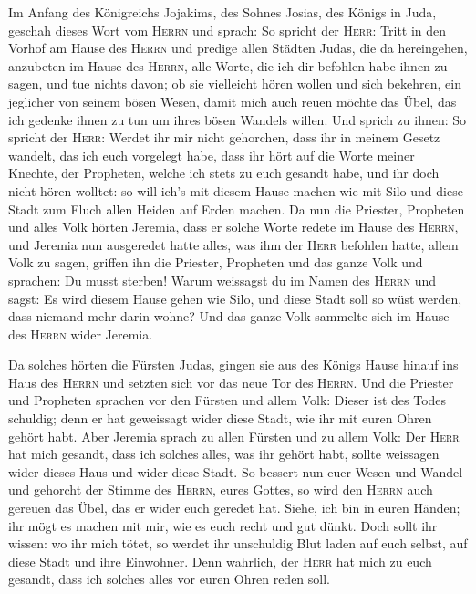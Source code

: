  Im Anfang des Königreichs Jojakims, des Sohnes Josias,
des Königs in Juda, geschah dieses Wort vom \textsc{Herrn} und sprach:
 So spricht der \textsc{Herr}: Tritt in den Vorhof am
Hause des \textsc{Herrn} und predige allen Städten Judas, die da
hereingehen, anzubeten im Hause des \textsc{Herrn}, alle Worte, die ich
dir befohlen habe ihnen zu sagen, und tue nichts davon; 
ob sie vielleicht hören wollen und sich bekehren, ein jeglicher von
seinem bösen Wesen, damit mich auch reuen möchte das Übel, das ich
gedenke ihnen zu tun um ihres bösen Wandels willen.  Und
sprich zu ihnen: So spricht der \textsc{Herr}: Werdet ihr mir nicht
gehorchen, dass ihr in meinem Gesetz wandelt, das ich euch vorgelegt
habe,  dass ihr hört auf die Worte meiner Knechte, der
Propheten, welche ich stets zu euch gesandt habe, und ihr doch nicht
hören wolltet:  so will ich's mit diesem Hause machen wie
mit Silo und diese Stadt zum Fluch allen Heiden auf Erden machen.
 Da nun die Priester, Propheten und alles Volk hörten
Jeremia, dass er solche Worte redete im Hause des \textsc{Herrn},
 und Jeremia nun ausgeredet hatte alles, was ihm der
\textsc{Herr} befohlen hatte, allem Volk zu sagen, griffen ihn die
Priester, Propheten und das ganze Volk und sprachen: Du musst sterben!
 Warum weissagst du im Namen des \textsc{Herrn} und sagst:
Es wird diesem Hause gehen wie Silo, und diese Stadt soll so wüst
werden, dass niemand mehr darin wohne? Und das ganze Volk sammelte sich
im Hause des \textsc{Herrn} wider Jeremia.

 Da solches hörten die Fürsten Judas, gingen sie aus des
Königs Hause hinauf ins Haus des \textsc{Herrn} und setzten sich vor das
neue Tor des \textsc{Herrn}.  Und die Priester und
Propheten sprachen vor den Fürsten und allem Volk: Dieser ist des Todes
schuldig; denn er hat geweissagt wider diese Stadt, wie ihr mit euren
Ohren gehört habt.  Aber Jeremia sprach zu allen Fürsten
und zu allem Volk: Der \textsc{Herr} hat mich gesandt, dass ich solches
alles, was ihr gehört habt, sollte weissagen wider dieses Haus und wider
diese Stadt.  So bessert nun euer Wesen und Wandel und
gehorcht der Stimme des \textsc{Herrn}, eures Gottes, so wird den
\textsc{Herrn} auch gereuen das Übel, das er wider euch geredet hat.
 Siehe, ich bin in euren Händen; ihr mögt es machen mit
mir, wie es euch recht und gut dünkt.  Doch sollt ihr
wissen: wo ihr mich tötet, so werdet ihr unschuldig Blut laden auf euch
selbst, auf diese Stadt und ihre Einwohner. Denn wahrlich, der
\textsc{Herr} hat mich zu euch gesandt, dass ich solches alles vor euren
Ohren reden soll.

